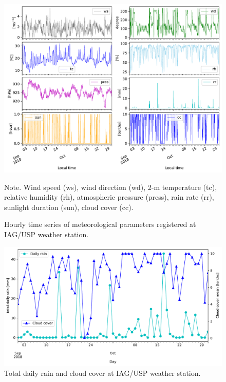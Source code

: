 	\begin{figure}
  		\includegraphics[width=1\textwidth]{fig/IAG_met.pdf}
  		\caption{Hourly time series of meteorological parameters registered at IAG/USP weather station.}
  		{\footnotesize Note. Wind speed (ws), wind direction (wd), 2-m temperature (tc), relative humidity (rh), atmospheric pressure (press), rain rate (rr), sunlight duration (sun), cloud cover (cc).}
  		\label{fig:met_iag}
  	\end{figure}
  	
	\begin{figure}
  		\centering
  		\includegraphics[width=1\textwidth]{fig/rain_cc_IAG.pdf}
  		\caption{Total daily rain and cloud cover at IAG/USP weather station.}
  		\label{fig:rain_cc_iag}
  	\end{figure}
  	
